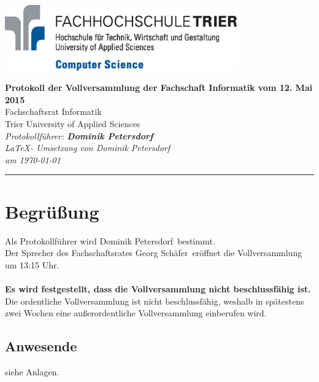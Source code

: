 \documentclass[a4paper, 11pt]{article} %
\newcommand{\protokoller}{Dominik Petersdorf}
\newcommand{\dateOfMeeting}{12. Mai 2015}
\newcommand{\TeXer}{Dominik Petersdorf}
\newcommand{\fsiPresident}{Georg Schäfer}
\begin{document}

\doublespacing
\thispagestyle{empty}

\begin{center}
\includegraphics[width=10.0cm]{../logo_faculty_computer_science.eps}

\vspace*{\fill}
\begin{singlespace}
	{\LARGE \textbf{Protokoll der Vollversammlung der Fachschaft Informatik 
			\singlespacing
			vom \dateOfMeeting}}\\
			Fachschaftsrat Informatik\\
			Trier University of Applied Sciences\\
			\vspace{2.5cm}
			\textit{
			Protokollführer: \textbf{\protokoller} \\
			\LaTeX - Umsetzung von \TeXer\\
			am \today
	}
\end{singlespace}

\vfill
\end{center}

\hspace*{-35cm}
\textcolor{fsi}{\rule{64.9cm}{15pt}}
\pagebreak
 
\setcounter{tocdepth}{2}
\tableofcontents 
\pagebreak

\section{Begrüßung}
Als Protokollführer wird \protokoller~bestimmt.\\
Der Sprecher des Fachschaftsrates \fsiPresident~eröffnet die Vollversammlung um 13:15 Uhr.
\\\\
\textbf{Es wird festgestellt, dass die Vollversammlung nicht beschlussfähig ist.}
Die ordentliche Vollversammlung ist nicht beschlussfähig, weshalb in spätestens zwei Wochen eine außerordentliche Vollversammlung einberufen wird.
\subsection{Anwesende}
siehe Anlagen.
\end{document}
